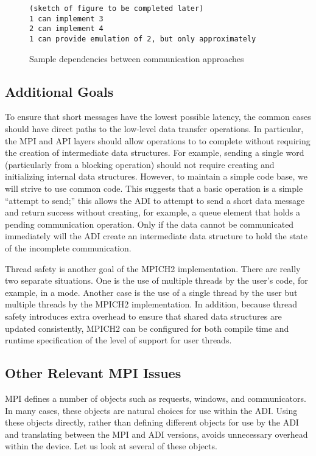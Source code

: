 \begin{figure}
\begin{verbatim}
(sketch of figure to be completed later)
1 can implement 3
2 can implement 4
1 can provide emulation of 2, but only approximately
\end{verbatim}
\caption{Sample dependencies between communication approaches}
\label{fig:comm-depend}
\end{figure}

\subsection{Additional Goals}
To ensure that short messages have the lowest possible latency, the
common cases should have direct paths to the low-level data transfer
operations.  In particular, the MPI and API layers
should allow operations to to complete without requiring the creation
of intermediate data structures.  For example, sending a single word
(particularly from a blocking  operation) should not
require creating and initializing internal data structures.  However,
to maintain a simple code base, we will strive to use common code.
This suggests that a basic operation is a simple ``attempt to
send;'' this allows the ADI to attempt to send a short data message
and return success without creating, for example, a queue element that
holds a pending communication operation.  Only if the data cannot be
communicated immediately will the ADI create an intermediate data
structure to hold the state of the incomplete communication.  

Thread safety is another goal of the MPICH2 implementation.  There are
really two separate situations.  One is the use of multiple threads by
the user's code, for example, in a  mode.
Another case is the use of a single thread by the user but multiple
threads by the MPICH2 implementation.  In addition, because thread
safety introduces extra overhead to ensure that shared data structures
are updated consistently, MPICH2 can be configured for both compile
time and runtime specification of the level of support for user threads.

\subsection{Other Relevant MPI Issues}
MPI defines a number of objects such as requests, windows, and
communicators.  In many cases, these objects are natural choices for
use within the ADI.  Using these objects directly, rather than defining
different objects for use by the ADI and translating between the MPI and ADI
versions, avoids unnecessary 
overhead within the device.  Let us look at several of these objects.

